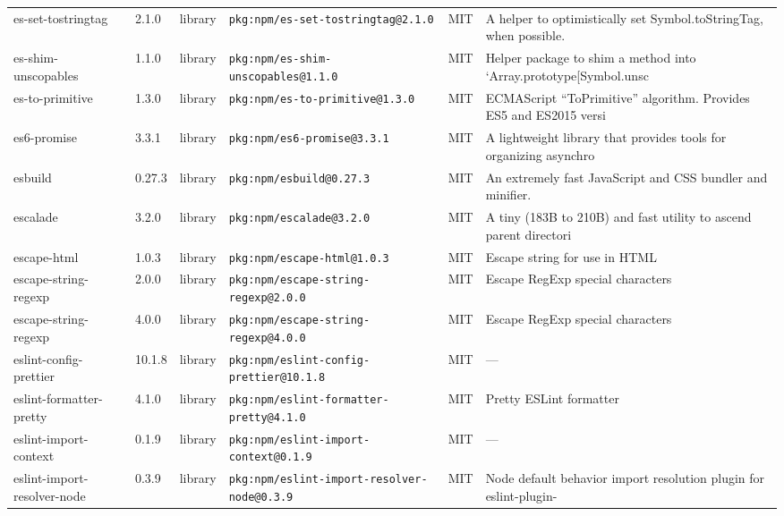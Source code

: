 \documentclass[11pt,a4paper]{article}
\begin{document}
\begin{longtable}{|p{4cm}|p{2cm}|p{1.6cm}|p{5cm}|p{1.5cm}|p{3.5cm}|}
\raggedright es-set-tostringtag & 2.1.0 & library & \small\texttt{pkg:npm/es-set-tostringtag@2.1.0} & MIT & \small A helper to optimistically set Symbol.toStringTag, when possible. \\
\raggedright es-shim-unscopables & 1.1.0 & library & \small\texttt{pkg:npm/es-shim-unscopables@1.1.0} & MIT & \small Helper package to shim a method into `Array.prototype[Symbol.unsc \\
\raggedright es-to-primitive & 1.3.0 & library & \small\texttt{pkg:npm/es-to-primitive@1.3.0} & MIT & \small ECMAScript “ToPrimitive” algorithm. Provides ES5 and ES2015 versi \\
\raggedright es6-promise & 3.3.1 & library & \small\texttt{pkg:npm/es6-promise@3.3.1} & MIT & \small A lightweight library that provides tools for organizing asynchro \\
\raggedright esbuild & 0.27.3 & library & \small\texttt{pkg:npm/esbuild@0.27.3} & MIT & \small An extremely fast JavaScript and CSS bundler and minifier. \\
\raggedright escalade & 3.2.0 & library & \small\texttt{pkg:npm/escalade@3.2.0} & MIT & \small A tiny (183B to 210B) and fast utility to ascend parent directori \\
\raggedright escape-html & 1.0.3 & library & \small\texttt{pkg:npm/escape-html@1.0.3} & MIT & \small Escape string for use in HTML \\
\raggedright escape-string-regexp & 2.0.0 & library & \small\texttt{pkg:npm/escape-string-regexp@2.0.0} & MIT & \small Escape RegExp special characters \\
\raggedright escape-string-regexp & 4.0.0 & library & \small\texttt{pkg:npm/escape-string-regexp@4.0.0} & MIT & \small Escape RegExp special characters \\
\raggedright eslint-config-prettier & 10.1.8 & library & \small\texttt{pkg:npm/eslint-config-prettier@10.1.8} & MIT & \small — \\
\raggedright eslint-formatter-pretty & 4.1.0 & library & \small\texttt{pkg:npm/eslint-formatter-pretty@4.1.0} & MIT & \small Pretty ESLint formatter \\
\raggedright eslint-import-context & 0.1.9 & library & \small\texttt{pkg:npm/eslint-import-context@0.1.9} & MIT & \small — \\
\raggedright eslint-import-resolver-node & 0.3.9 & library & \small\texttt{pkg:npm/eslint-import-resolver-node@0.3.9} & MIT & \small Node default behavior import resolution plugin for eslint-plugin- \\

\end{longtable}
\end{document}
